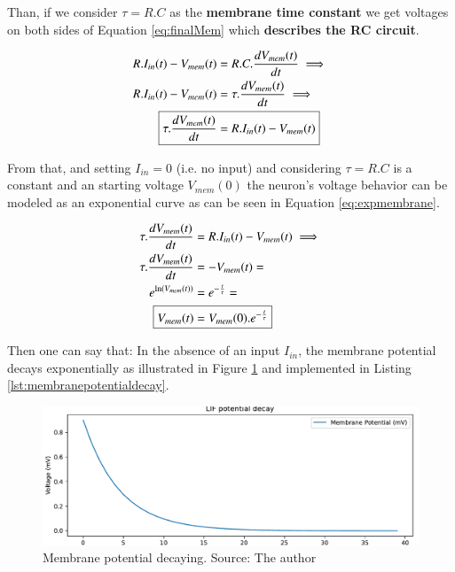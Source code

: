 			\par Than, if we consider $\tau = R.C$ as the \textbf{membrane time constant} we get voltages on both sides of Equation \ref{eq:finalMem} which \textbf{describes the RC circuit}.
		
			\begin{equation}
				\label{eq:finalMem}
				\begin{aligned}
				R.I_{in}(t) - V_{mem}(t) &=  R.C.\dfrac{dV_{mem}(t)}{dt} \implies \\
				R.I_{in}(t) - V_{mem}(t) &=  \tau.\dfrac{dV_{mem}(t)}{dt} \implies \\
				\Aboxed{\tau.\dfrac{dV_{mem}(t)}{dt} &= R.I_{in}(t) - V_{mem}(t)}
				\end{aligned}
			\end{equation}
		
			\par From that, and setting $I_{in} = 0$ (i.e. no input) and considering $\tau = R.C$ is a constant and an starting voltage $V_{mem}(0)$ the neuron's voltage behavior can be modeled as an exponential curve as can be seen in Equation \ref{eq:expmembrane}.
		
		 	\begin{equation}
		 		\label{eq:expmembrane}
		 		\begin{aligned}
		 		\tau.\dfrac{dV_{mem}(t)}{dt} &= R.I_{in}(t) - V_{mem}(t) \implies \\
		 		\tau.\dfrac{dV_{mem}(t)}{dt} &= -V_{mem}(t) = \\
		 		e^{\ln(V_{mem}(t))} &= e^{-\frac{t}{\tau}} = \\
		 		\Aboxed{V_{mem}(t) &= V_{mem}(0).e^{-\frac{t}{\tau}}}
		 		\end{aligned}
		 	\end{equation}
	 	
	 		\par Then one can say that: In the absence of an input $I_{in}$, the membrane potential decays exponentially as illustrated in Figure \ref{fig:membranepotentialdecay} and implemented in Listing \ref{lst:membranepotentialdecay}.
	 		
	 			

		 		\begin{figure}[H]
		 			\centering
		 			\includegraphics[width=\linewidth]{images/membranePotentialDecay}
		 			\caption{Membrane potential decaying. Source: The author}
		 			\label{fig:membranepotentialdecay}
		 		\end{figure}
 			

